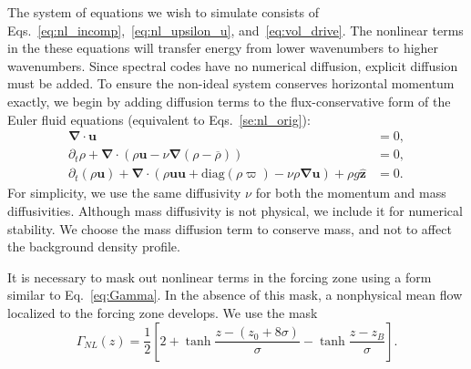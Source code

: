 \documentclass[
        fleqn,
        usenatbib,
    ]{mnras}
\newcommand*{\pd}[2]{\frac{\partial#1}{\partial#2}}
\newcommand*{\p}[1]{\left(#1\right)}
\newcommand*{\s}[1]{\left[#1\right]}
\newcommand*{\bm}[1]{\mathbf{#1}}
\newcommand*{\uv}[1]{\hat{\mathbf{#1}}}
\begin{document}
The system of equations we wish to simulate consists of
Eqs.~\eqref{eq:nl_incomp},~\eqref{eq:nl_upsilon_u}, and~\eqref{eq:vol_drive}.
The nonlinear terms in the these equations will transfer energy from lower
wavenumbers to higher wavenumbers. Since spectral codes have no numerical
diffusion, explicit diffusion must be added. To ensure the non-ideal
system conserves horizontal momentum exactly, we begin by adding diffusion
terms to the flux-conservative form of the Euler fluid equations
(equivalent to Eqs.~\ref{se:nl_orig}):
\begin{subequations}
    \begin{align}
        \bm{\nabla} \cdot \bm{u} &= 0,\\
        \partial_t \rho + \bm{\nabla} \cdot (\rho \bm{u} - \nu
            \bm{\nabla}(\rho - \overline{\rho})) &= 0,\label{eq:visc_cons_mom}\\
        \partial_t (\rho \bm{u}) + \bm{\nabla} \cdot (\rho \bm{u} \bm{u}
            + \mathrm{diag}(\rho \varpi)
            - \nu \rho \bm{\nabla}\bm{u})
            + \rho g \uv{z} &= 0.
    \end{align}
\end{subequations}
For simplicity, we use the same diffusivity $\nu$ for both the momentum and mass
diffusivities. Although mass diffusivity is not physical, we include it for
numerical stability. We choose the mass diffusion term to conserve mass, and not
to affect the background density profile.

It is necessary to mask out nonlinear terms in the forcing zone using a form
similar to Eq.~\eqref{eq:Gamma}. In the absence of this mask, a nonphysical mean
flow localized to the forcing zone develops. We use the mask
\begin{equation}
    \Gamma_{NL}(z) = \frac{1}{2}\s{2
        + \tanh \frac{z - (z_0 + 8\sigma)}{\sigma}
        - \tanh \frac{z - z_B}{\sigma}}.
\end{equation}
\end{document}
